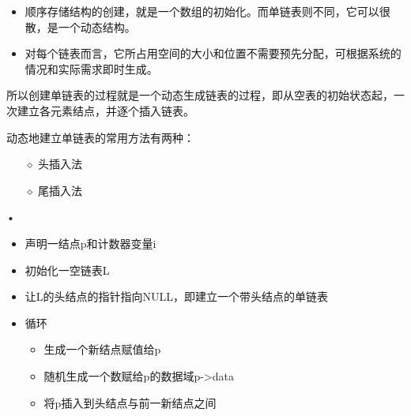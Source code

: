 \begin{frame}[fragile]\ft{\subsecname}
  
\end{frame}

\begin{frame}[fragile]\ft{\subsecname}
 
\end{frame}


\begin{frame}[fragile]\ft{\subsecname}
  
\end{frame}

\begin{frame}\ft{\subsecname}
  \begin{itemize}
  \item  顺序存储结构的创建，就是一个数组的初始化。而单链表则不同，它可以很散，是一个动态结构。
  \item 对每个链表而言，它所占用空间的大小和位置不需要预先分配，可根据系统的情况和实际需求即时生成。
  \end{itemize}
  
  所以创建单链表的过程就是一个动态生成链表的过程，即从空表的初始状态起，一次建立各元素结点，并逐个插入链表。
\end{frame}


\begin{frame}\ft{\subsecname} 
动态地建立单链表的常用方法有两种：
\begin{itemize}
\item[$\diamond$]
头插入法
\item[$\diamond$]
尾插入法
\end{itemize}•
\end{frame}

\begin{frame}\ft{\subsecname}
  \begin{itemize}
  \item 声明一结点{\ttfamily p}和计数器变量{\ttfamily i}
  \item 初始化一空链表{\ttfamily L}
  \item 让{\ttfamily L}的头结点的指针指向{\ttfamily NULL}，即建立一个带头结点的单链表
  \item 循环
    \begin{itemize}
    \item 生成一个新结点赋值给{\ttfamily p}\\[0.1in]
    \item 随机生成一个数赋给{\ttfamily p}的数据域{\ttfamily p->data}\\[0.1in]
    \item 将{\ttfamily p}插入到头结点与前一新结点之间
    \end{itemize}
  \end{itemize}
\end{frame}

